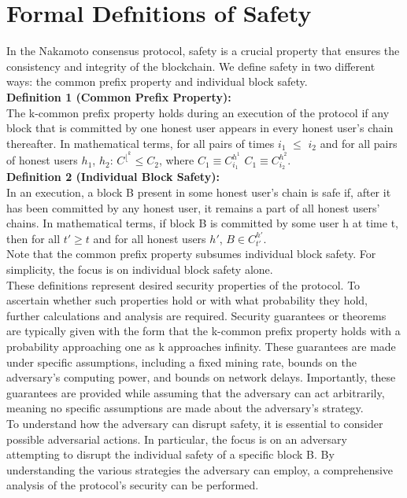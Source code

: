 \documentclass{report}
\begin{document}
\section{Formal Defnitions of Safety}
In the Nakamoto consensus protocol, safety is a crucial property that ensures the consistency and integrity of the blockchain. We define safety in two different ways: the common prefix property and individual block safety.\\
\textbf{Definition 1 (Common Prefix Property):}\\
The k-common prefix property holds during an execution of the protocol if any block that is committed by one honest user appears in every honest user's chain thereafter. In mathematical terms, for all pairs of times $i_{1}$ $\leq$ $i_{2}$ and for all pairs of honest users $h_{1}$, $h_{2}$:
$C^{⌊^{k}} \leq C_{2}$,
where $C_{1} ≡ C_{i_{1}}^{h^{1}}$  $C_{1} ≡ C_{i_{2}}^{h^{2}}.$\\
\textbf{Definition 2 (Individual Block Safety):}\\
In an execution, a block B present in some honest user's chain is safe if, after it has been committed by any honest user, it remains a part of all honest users' chains. In mathematical terms, if block B is committed by some user h at time t, then for all $t' \geq t$ and for all honest users $h′$, $B \in C_{t'}^{h′}$.\\
Note that the common prefix property subsumes individual block safety. For simplicity, the focus is on individual block safety alone.\\
These definitions represent desired security properties of the protocol. To ascertain whether such properties hold or with what probability they hold, further calculations and analysis are required. Security guarantees or theorems are typically given with the form that the k-common prefix property holds with a probability approaching one as k approaches infinity. These guarantees are made under specific assumptions, including a fixed mining rate, bounds on the adversary's computing power, and bounds on network delays. Importantly, these guarantees are provided while assuming that the adversary can act arbitrarily, meaning no specific assumptions are made about the adversary's strategy.\\
To understand how the adversary can disrupt safety, it is essential to consider possible adversarial actions. In particular, the focus is on an adversary attempting to disrupt the individual safety of a specific block B. By understanding the various strategies the adversary can employ, a comprehensive analysis of the protocol's security can be performed.
\end{document}
